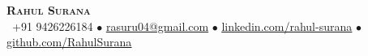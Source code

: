 \vspace{-12pt}
\begin{center}
    \textbf{\Huge \scshape Rahul Surana} \\ \vspace{4pt}
     \ \small +91 9426226184  \quad $\bullet$ \quad
    \href{mailto:rasuru04@gmail.com}{ \underline{rasuru04@gmail.com}} \quad $\bullet$ \quad
    \href{https://www.linkedin.com/in/rahul-surana}{ \underline{linkedin.com/rahul-surana}} \quad $\bullet$ \quad
    \href{https://github.com/RahulSurana123}{ \underline{github.com/RahulSurana}}
\end{center}
